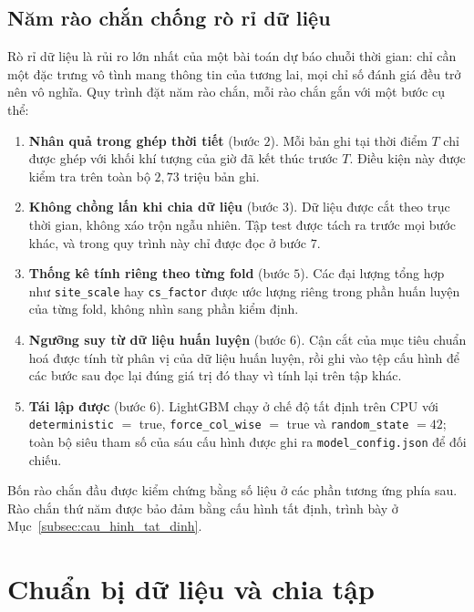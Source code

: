 \documentclass[12pt, a4paper]{report}
\begin{document}
\FloatBarrier
\subsection{Năm rào chắn chống rò rỉ dữ liệu}
\label{subsec:nam_rao_chan}

Rò rỉ dữ liệu là rủi ro lớn nhất của một bài toán dự báo chuỗi thời gian: chỉ cần một
đặc trưng vô tình mang thông tin của tương lai, mọi chỉ số đánh giá đều trở nên vô
nghĩa. Quy trình đặt năm rào chắn, mỗi rào chắn gắn với một bước cụ thể:

\begin{enumerate}
    \item \textbf{Nhân quả trong ghép thời tiết} (bước $2$). Mỗi bản ghi tại thời điểm
    $T$ chỉ được ghép với khối khí tượng của giờ đã kết thúc trước $T$. Điều kiện này
    được kiểm tra trên toàn bộ $2{,}73$ triệu bản ghi.

    \item \textbf{Không chồng lấn khi chia dữ liệu} (bước $3$). Dữ liệu được cắt theo
    trục thời gian, không xáo trộn ngẫu nhiên. Tập test được tách ra trước mọi bước
    khác, và trong quy trình này chỉ được đọc ở bước $7$.

    \item \textbf{Thống kê tính riêng theo từng fold} (bước $5$). Các đại lượng tổng
    hợp như \texttt{site\_scale} hay \texttt{cs\_factor} được ước lượng riêng trong
    phần huấn luyện của từng fold, không nhìn sang phần kiểm định.

    \item \textbf{Ngưỡng suy từ dữ liệu huấn luyện} (bước $6$). Cận cắt của mục tiêu
    chuẩn hoá được tính từ phân vị của dữ liệu huấn luyện, rồi ghi vào tệp cấu hình để
    các bước sau đọc lại đúng giá trị đó thay vì tính lại trên tập khác.

    \item \textbf{Tái lập được} (bước $6$). LightGBM chạy ở chế độ tất định trên CPU với
    \texttt{deterministic} $=$ true, \texttt{force\_col\_wise} $=$ true và
    \texttt{random\_state} $=42$; toàn bộ siêu tham số của sáu cấu hình được ghi ra
    \texttt{model\_config.json} để đối chiếu.
\end{enumerate}

Bốn rào chắn đầu được kiểm chứng bằng số liệu ở các phần tương ứng phía sau. Rào chắn
thứ năm được bảo đảm bằng cấu hình tất định, trình bày ở Mục~\ref{subsec:cau_hinh_tat_dinh}.

\FloatBarrier
\section{Chuẩn bị dữ liệu và chia tập}
\end{document}
